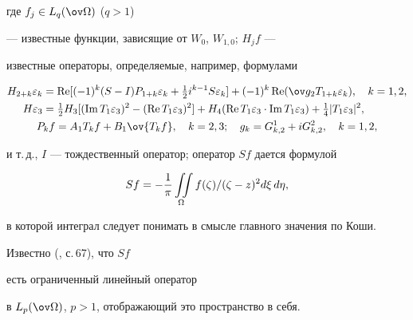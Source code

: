 где $f_j\in L_q(\ov\Omega)$ ($q>1$) 


--- известные функции, зависящие от $W_0$, $W_{1,0}$; $H_jf$ --- 


известные операторы, определяемые, например, формулами 


\begin{gather} 


\begin{split} 


H_{2+k}\varepsilon_k&=\re[(-1)^k(S-I)P_{1+k}\varepsilon_k+ 


\tfrac{1}{2}i^{k-1}S\varepsilon_k]+(-1)^k\re 


(\ov g_2T_{1+k}\varepsilon_k),\quad k=1,2, \\ 


H\varepsilon_3&=\tfrac{1}{2}H_3[(\im T_1\varepsilon_3)^2- 


(\re T_1\varepsilon_3)^2]+H_4(\re T_1\varepsilon_3\cdot 


\im T_1\varepsilon_3)+\tfrac{1}{4}|T_1\varepsilon_3|^2, 


\end{split} 


\\ 


P_kf=A_1T_kf+B_1\ov{T_kf},\quad k=2,3;\quad 


g_k=G^1_{k,2}+iG^2_{k,2},\quad k=1,2, 


\end{gather} 


и т.\,д., $I$ --- тождественный оператор; оператор $Sf$ дается формулой 


$$


Sf=-\frac{1}{\pi}\intO f(\zeta)/(\zeta-z)^2d\xi\,d\eta,


$$


в которой интеграл следует понимать в смысле главного значения по Коши. 


Известно (\cite{3}, с.\,67), что $Sf$ 


есть ограниченный линейный оператор 


в $L_p(\ov\Omega)$, $p>1$, отображающий это пространство в себя. 


 


